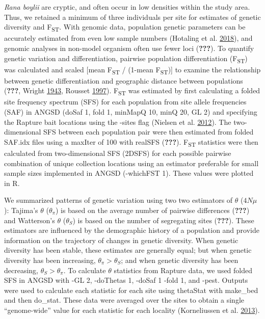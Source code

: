 \documentclass[proquest,12pt,final]{ucthesis-CA2012} %
\begin{document}
\begin{ucmainmatter}
\emph{Rana boylii} are cryptic, and often occur in low densities within
the study area. Thus, we retained a minimum of three individuals per
site for estimates of genetic diversity and F\textsubscript{ST}. With
genomic data, population genetic parameters can be accurately estimated
from even low sample numbers (Hotaling et al.
\protect\hyperlink{ref-hotaling_demographic_2018}{2018}), and genomic
analyses in non-model organism often use fewer loci ({\textbf{???}}). To
quantify genetic variation and differentiation, pairwise population
differentiation (F\textsubscript{ST}) was calculated and scaled {[}mean
F\textsubscript{ST} / (1-mean F\textsubscript{ST}){]} to examine the
relationship between genetic differentiation and geographic distance
between populations ({\textbf{???}}, Wright
\protect\hyperlink{ref-wright_isolation_1943}{1943}, Rousset
\protect\hyperlink{ref-rousset_genetic_1997}{1997}). F\textsubscript{ST}
was estimated by first calculating a folded site frequency spectrum
(SFS) for each population from site allele frequencies (SAF) in ANGSD
(doSaf 1, fold 1, minMapQ 10, minQ 20, GL 2) and specifying the Rapture
bait locations using the -sites flag (Nielsen et al.
\protect\hyperlink{ref-nielsen_snp_2012}{2012}). The two-dimensional SFS
between each population pair were then estimated from folded SAF.idx
files using a maxIter of 100 with realSFS ({\textbf{???}}).
F\textsubscript{ST} statistics were then calculated from two-dimensional
SFS (2DSFS) for each possible pairwise combination of unique collection
locations using an estimator preferable for small sample sizes
implemented in ANGSD (-whichFST 1). These values were plotted in R.

We summarized patterns of genetic variation using two two estimators of
\(\theta\) (\(4N\mu\)): Tajima's \(\theta\) (\(\theta_\pi\)) is based on
the average number of pairwise differences ({\textbf{???}}) and
Watterson's \(\theta\) (\(\theta_S\)) is based on the number of
segregating sites ({\textbf{???}}). These estimators are influenced by
the demographic history of a population and provide information on the
trajectory of changes in genetic diversity. When genetic diversity has
been stable, these estimates are generally equal; but when genetic
diversity has been increasing, \(\theta_\pi > \theta_S\); and when
genetic diversity has been decreasing, \(\theta_S > \theta_\pi\). To
calculate \(\theta\) statistics from Rapture data, we used folded SFS in
ANGSD with -GL 2, -doThetas 1, -doSaf 1 -fold 1, and -pest. Outputs were
used to calculate each statistic for each site using thetaStat with
make\_bed and then do\_stat. These data were averaged over the sites to
obtain a single ``genome-wide'' value for each statistic for each
locality (Korneliussen et al.
\protect\hyperlink{ref-korneliussen_calculation_2013}{2013}).


\end{ucmainmatter}
\end{document}
